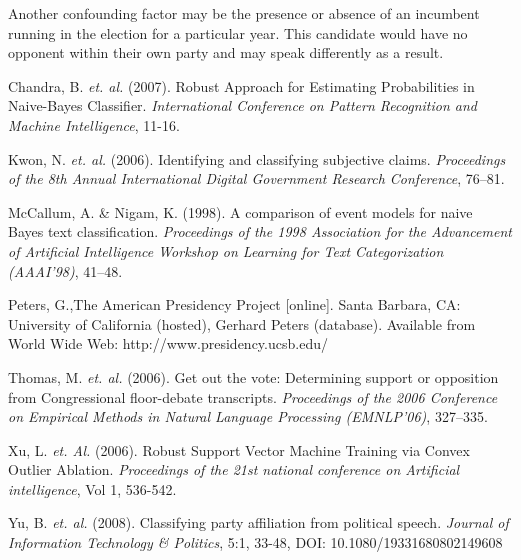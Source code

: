 \documentclass[aps, prl, reprint, showpacs]{revtex4-1}
\begin{document}
Another confounding factor may be the presence or absence of an incumbent running in the election for a particular year. This candidate would have no opponent within their own party and may speak differently as a result.



\begin{thebibliography}{7}

Chandra, B. \textit{et. al.} (2007). Robust Approach for Estimating Probabilities in Naive-Bayes Classifier. \textit{International Conference on Pattern Recognition and Machine Intelligence}, 11-16.

Kwon, N. \textit{et. al.} (2006). Identifying and classifying subjective claims. \textit{Proceedings of the 8th Annual International Digital Government Research Conference}, 76–81.

McCallum, A. \& Nigam, K. (1998). A comparison of event models for naive Bayes text classification. \textit{Proceedings of the 1998 Association for the Advancement of Artificial Intelligence Workshop on Learning for Text Categorization (AAAI’98)}, 41–48.

Peters, G.,The American Presidency Project [online]. Santa Barbara, CA: University of California (hosted), Gerhard Peters (database). Available from World Wide Web: http://www.presidency.ucsb.edu/

Thomas, M. \textit{et. al.} (2006). Get out the vote: Determining support or opposition from Congressional floor-debate transcripts. \textit{Proceedings of the 2006 Conference on Empirical Methods in Natural Language Processing (EMNLP’06)}, 327–335.

Xu, L. \textit{et. Al.} (2006). Robust Support Vector Machine Training via Convex Outlier Ablation. \textit{Proceedings of the 21st national conference on Artificial intelligence}, Vol 1, 536-542.

Yu, B. \textit{et. al.} (2008). Classifying party affiliation from political speech. \textit{Journal of Information Technology \& Politics}, 5:1, 33-48, DOI: 10.1080/19331680802149608

\end{thebibliography}
\end{document}
